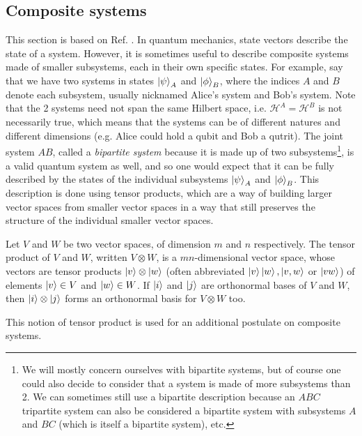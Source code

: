 \subsection{Composite systems}

This section is based on Ref. \cite[pp. 71-75, 93-96]{nielsen_quantum_2010}. In quantum mechanics, state vectors describe the state of a system. However, it is sometimes useful to describe composite systems made of smaller subsystems, each in their own specific states. For example, say that we have two systems in states $\ket{\psi}_A$ and $\ket{\phi}_B$, where the indices $A$ and $B$ denote each subsystem, usually nicknamed Alice's system and Bob's system. Note that the 2 systems need not span the same Hilbert space, i.e. $\mathcal{H}^A = \mathcal{H}^B$ is not necessarily true, which means that the systems can be of different natures and different dimensions (e.g. Alice could hold a qubit and Bob a qutrit). The joint system $AB$, called a \textit{bipartite system} because it is made up of two subsystems\footnote{We will mostly concern ourselves with bipartite systems, but of course one could also decide to consider that a system is made of more subsystems than 2. We can sometimes still use a bipartite description because an $ABC$ tripartite system can also be considered a bipartite system with subsystems $A$ and $BC$ (which is itself a bipartite system), etc.}, is a valid quantum system as well, and so one would expect that it can be fully described by the states of the individual subsystems $\ket{\psi}_A$ and $\ket{\phi}_B$. This description is done using tensor products, which are a way of building larger vector spaces from smaller vector spaces in a way that still preserves the structure of the individual smaller vector spaces.

\begin{definition}
    Let $V$ and $W$ be two vector spaces, of dimension $m$ and $n$ respectively. The tensor product of $V$ and $W$, written $V \otimes W$, is a $mn$-dimensional vector space, whose vectors are tensor products $\ket{v} \otimes \ket{w}$ (often abbreviated $\ket{v}\ket{w}, \ket{v, w}$ or $\ket{vw}$) of elements $\ket{v} \in V$ and $\ket{w} \in W$. If $\ket{i}$ and $\ket{j}$ are orthonormal bases of $V$ and $W$, then $\ket{i} \otimes \ket{j}$ forms an orthonormal basis for $V \otimes W$ too.
\end{definition}

\noindent This notion of tensor product is used for an additional postulate on composite systems.

